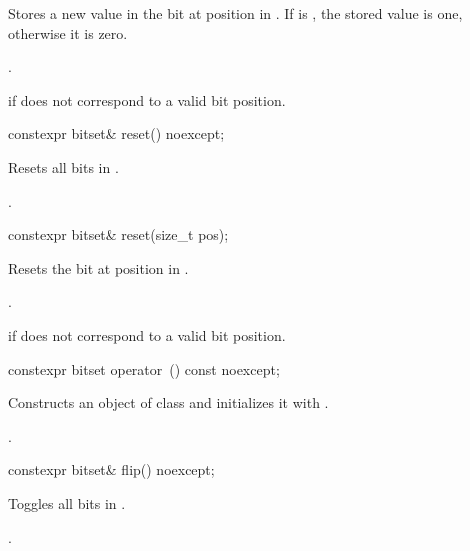 \begin{itemdescr}
\pnum
\effects
Stores a new value in the bit at position  in
.
If  is , the stored value is one, otherwise it is zero.

\pnum
\returns
{}.

\pnum
\throws
{}%
 if  does not correspond to a valid bit position.
\end{itemdescr}

%
\begin{itemdecl}
constexpr bitset& reset() noexcept;
\end{itemdecl}

\begin{itemdescr}
\pnum
\effects
Resets all bits in
.

\pnum
\returns
{}.
\end{itemdescr}

%
\begin{itemdecl}
constexpr bitset& reset(size_t pos);
\end{itemdecl}

\begin{itemdescr}
\pnum
\effects
Resets the bit at position  in
.

\pnum
\returns
{}.

\pnum
\throws
{}%
 if  does not correspond to a valid bit position.
\end{itemdescr}

%
\begin{itemdecl}
constexpr bitset operator~() const noexcept;
\end{itemdecl}

\begin{itemdescr}
\pnum
\effects
Constructs an object  of class
and initializes it with
.

\pnum
\returns
{}.
\end{itemdescr}

%
\begin{itemdecl}
constexpr bitset& flip() noexcept;
\end{itemdecl}

\begin{itemdescr}
\pnum
\effects
Toggles all bits in
.

\pnum
\returns
{}.
\end{itemdescr}

